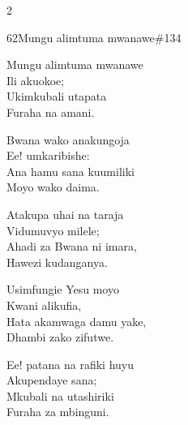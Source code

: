 \begin{multicols}{2}
\begin{hymn}{62}{Mungu alimtuma mwanawe}{\#134}
\begin{stanza}
Mungu alimtuma mwanawe\\
Ili akuokoe;\\
Ukimkubali utapata\\
Furaha na amani.
\end{stanza}
\begin{chorus}
Bwana wako anakungoja\\
Ee! umkaribishe:\\
Ana hamu sana kuumiliki\\
Moyo wako daima.
\end{chorus}
\begin{stanza}
Atakupa uhai na taraja\\
Vidumuvyo milele;\\
Ahadi za Bwana ni imara,\\
Hawezi kudanganya.
\end{stanza}
\begin{stanza}
Usimfungie Yesu moyo\\
Kwani alikufia,\\
Hata akamwaga damu yake,\\
Dhambi zako zifutwe.
\end{stanza}
\begin{stanza}
Ee! patana na rafiki huyu\\
Akupendaye sana;\\
Mkubali na utashiriki\\
Furaha za mbinguni.
\end{stanza}
\end{hymn}


\end{multicols}
